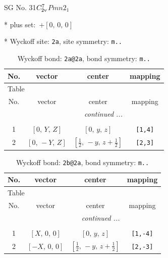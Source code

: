 \documentclass[fleqn,8pt]{jsarticle}
\begin{document}
\setcounter{MaxMatrixCols}{32}

\renewcommand{\tablename}{Table~}
\renewcommand{\figurename}{Figure~}
\begin{center}
\LARGE
SG No. 31\quad$C_{\rm 2v}^{7}$\quad$Pmn2_1$\quad[ orthorhombic ]
\end{center}

* plus set:\,\,\,$+\left[ 0,\, 0,\, 0 \right]$


* Wyckoff site: {\tt 2a}, site symmetry: {\tt m..}
\renewcommand{\arraystretch}{1.2}
\begin{longtable}{cccc}
\caption{Wyckoff bond: {\tt 2a@2a}, bond symmetry: {\tt m..}}
 \\
 \hline \hline
No. & vector & center & mapping \\ \hline \endfirsthead

\multicolumn{3}{l}{\tablename\ \thetable{}} \\
 \hline \hline
No. & vector & center & mapping \\ \hline \endhead

 \hline \hline
\multicolumn{3}{r}{\footnotesize\it continued ...} \\ \endfoot

 \hline \hline
\multicolumn{3}{r}{} \\ \endlastfoot

1 & $\left[ 0,\, Y,\, Z \right]$ & $\left[ 0,\, y,\, z \right]$ & {\tt [1,4]} \\ \hline
2 & $\left[ 0,\, - Y,\, Z \right]$ & $\left[ \frac{1}{2},\, - y,\, z + \frac{1}{2} \right]$ & {\tt [2,3]} \\
\end{longtable}
\renewcommand{\arraystretch}{1.2}
\begin{longtable}{cccc}
\caption{Wyckoff bond: {\tt 2b@2a}, bond symmetry: {\tt m..}}
 \\
 \hline \hline
No. & vector & center & mapping \\ \hline \endfirsthead

\multicolumn{3}{l}{\tablename\ \thetable{}} \\
 \hline \hline
No. & vector & center & mapping \\ \hline \endhead

 \hline \hline
\multicolumn{3}{r}{\footnotesize\it continued ...} \\ \endfoot

 \hline \hline
\multicolumn{3}{r}{} \\ \endlastfoot

1 & $\left[ X,\, 0,\, 0 \right]$ & $\left[ 0,\, y,\, z \right]$ & {\tt [1,-4]} \\ \hline
2 & $\left[ - X,\, 0,\, 0 \right]$ & $\left[ \frac{1}{2},\, - y,\, z + \frac{1}{2} \right]$ & {\tt [2,-3]} \\
\end{longtable}
\end{document}
